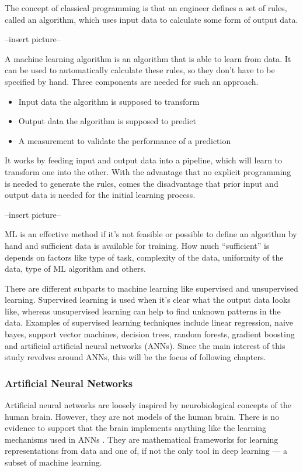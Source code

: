 The concept of classical programming is that an engineer defines a set of rules, called an algorithm, which uses input data to calculate some form of output data\cite{Chollet2017}.

--insert picture--

A machine learning algorithm is an algorithm that is able to learn from data\cite{Goodfellow2016}. It can be used to automatically calculate these rules, so they don't have to be specified by hand. Three components are needed for such an approach.

\begin{itemize}
\item Input data the algorithm is supposed to transform
\item Output data the algorithm is supposed to predict
\item A measurement to validate the performance of a prediction
\end{itemize}

It works by feeding input and output data into a pipeline, which will learn to transform one into the other. With the advantage that no explicit programming is needed to generate the rules, comes the disadvantage that prior input and output data is needed for the initial learning process.

--insert picture--

ML is an effective method if it's not feasible or possible to define an algorithm by hand and sufficient data is available for training. How much “sufficient” is depends on factors like type of task, complexity of the data, uniformity of the data, type of ML algorithm and others.

There are different subparts to machine learning like supervised and unsupervised learning. Supervised learning is used when it's clear what the output data looks like, whereas unsupervised learning can help to find unknown patterns in the data. Examples of supervised learning techniques include linear regression, naive bayes, support vector machines, decision trees, random forests, gradient boosting and artificial artificial neural networks (ANNs). Since the main interest of this study revolves around ANNs, this will be the focus of following chapters.

\subsubsection{Artificial Neural Networks}

Artificial neural networks are loosely inspired by neurobiological concepts of the human brain. However, they are not models of the human brain. There is no evidence to support that the brain implements anything like the learning mechanisms used in ANNs \cite{Chollet2017}. They are mathematical frameworks for learning representations from data and one of, if not the only tool in deep learning --- a subset of machine learning.


